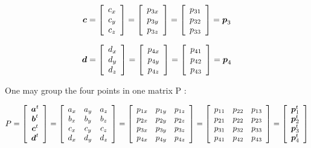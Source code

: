\documentclass{article}
\newcommand{\bm}[1]{\mbox{\boldmath$#1$}}
\begin{document}
$$
\bm{c} = 
\left[\begin{array}{c}
 c_x \\
 c_y \\
 c_z
\end{array}\right]
=
\left[\begin{array}{c}
 p_{3x} \\
 p_{3y} \\
 p_{3z}
\end{array}\right]
=
\left[\begin{array}{c}
 p_{31} \\
 p_{32} \\
 p_{33}
\end{array}\right]
= \bm{p}_3
$$

$$
\mbox{\boldmath$d$} = 
\left[\begin{array}{c}
 d_x \\
 d_y \\
 d_z
\end{array}\right]
=
\left[\begin{array}{c}
 p_{4x} \\
 p_{4y} \\
 p_{4z}
\end{array}\right]
=
\left[\begin{array}{c}
 p_{41} \\
 p_{42} \\
 p_{43}
\end{array}\right]
= \bm{p}_4
$$

One may group the four points in one matrix P :

$$
P =
\left[\begin{array}{c}
 \bm{a}^t \\
 \bm{b}^t \\
 \bm{c}^t \\
 \bm{d}^t
\end{array}\right]
=
\left[\begin{array}{ccc}
 a_x & a_y & a_z \\
 b_x & b_y & b_z \\
 c_x & c_y & c_z \\
 d_x & d_y & d_z
\end{array}\right]
=
\left[\begin{array}{ccc}
 p_{1x} & p_{1y} & p_{1z} \\
 p_{2x} & p_{2y} & p_{2z} \\
 p_{3x} & p_{3y} & p_{3z} \\
 p_{4x} & p_{4y} & p_{4z}
\end{array}\right]
=
\left[\begin{array}{ccc}
 p_{11} & p_{22} & p_{13} \\
 p_{21} & p_{22} & p_{23} \\
 p_{31} & p_{32} & p_{33} \\
 p_{41} & p_{42} & p_{43}
\end{array}\right]
=
\left[\begin{array}{c}
 \bm{p}_1^t \\
 \bm{p}_2^t \\
 \bm{p}_3^t \\
 \bm{p}_4^t
\end{array}\right]
$$
\end{document}
